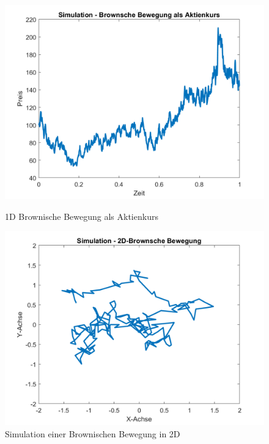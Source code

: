 \begin{figure}
	\centering
	\begin{minipage}{0.45\textwidth}
		\centering
		\includegraphics[width=\linewidth]{papers/brown/images/Aktienkurs-als-Brownische-Bewegung_2.png}
		\caption{1D Brownische Bewegung als Aktienkurs}
	\end{minipage}
	\hspace{0.05\linewidth}
	\begin{minipage}{0.45\textwidth}
		\centering
		\includegraphics[width=\linewidth]{papers/brown/images/Brownische-Bewegung-Simuliert_2.png}
		\caption{Simulation einer Brownischen Bewegung in 2D}
	\end{minipage}
\end{figure}

